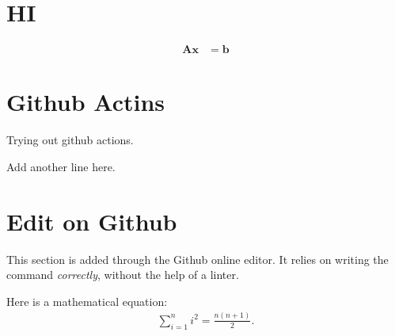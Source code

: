 \documentclass{article}
\begin{document}
\section{HI}
\begin{align}
 \mathbf{A}\mathbf{x} &= \mathbf{b}
\end{align}

\section{Github Actins}
Trying out github actions.

Add another line here.

\section{Edit on Github}
This section is added through the Github online editor.
It relies on writing the command \emph{correctly}, without the help of a linter.

Here is a mathematical equation:
\begin{align}
  \sum_{i=1}^{n}i^{2}
    = \frac{n(n+1)}{2}.
\end{align}
\end{document}

